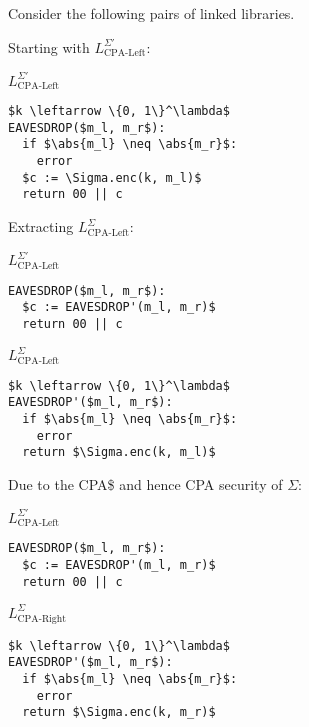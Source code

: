 \documentclass[a4paper]{scrreprt}
\DeclarePairedDelimiter\abs{\lvert}{\rvert}
\begin{document}
Consider the following pairs of linked libraries.

Starting with $L^{\Sigma'}_{\text{CPA-Left}}$:
\begin{library}{$L^{\Sigma'}_{\text{CPA-Left}}$}
	\begin{lstlisting}[mathescape=true]
$k \leftarrow \{0, 1\}^\lambda$
EAVESDROP($m_l, m_r$):
  if $\abs{m_l} \neq \abs{m_r}$:
    error
  $c := \Sigma.enc(k, m_l)$
  return 00 || c
	\end{lstlisting}
\end{library}

Extracting $L^{\Sigma}_{\text{CPA-Left}}$:

\begin{tcbraster}[raster columns=2,raster equal height,nobeforeafter,raster column skip=2cm]
	\begin{library}{$L^{\Sigma'}_{\text{CPA-Left}}$}
		\begin{lstlisting}[mathescape=true]
EAVESDROP($m_l, m_r$):
  $c := EAVESDROP'(m_l, m_r)$
  return 00 || c
		\end{lstlisting}
	\end{library}
	\begin{library}{$L^{\Sigma}_{\text{CPA-Left}}$}
		\begin{lstlisting}[mathescape=true]
$k \leftarrow \{0, 1\}^\lambda$
EAVESDROP'($m_l, m_r$):
  if $\abs{m_l} \neq \abs{m_r}$:
    error
  return $\Sigma.enc(k, m_l)$
		\end{lstlisting}
	\end{library}
\end{tcbraster}

Due to the CPA\$ and hence CPA security of $\Sigma$:
\begin{tcbraster}[raster columns=2,raster equal height,nobeforeafter,raster column skip=2cm]
	\begin{library}{$L^{\Sigma'}_{\text{CPA-Left}}$}
		\begin{lstlisting}[mathescape=true]
EAVESDROP($m_l, m_r$):
  $c := EAVESDROP'(m_l, m_r)$
  return 00 || c
		\end{lstlisting}
	\end{library}
	\begin{library}{$L^{\Sigma}_{\text{CPA-Right}}$}
		\begin{lstlisting}[mathescape=true]
$k \leftarrow \{0, 1\}^\lambda$
EAVESDROP'($m_l, m_r$):
  if $\abs{m_l} \neq \abs{m_r}$:
    error
  return $\Sigma.enc(k, m_r)$
		\end{lstlisting}
	\end{library}
\end{tcbraster}
\end{document}
